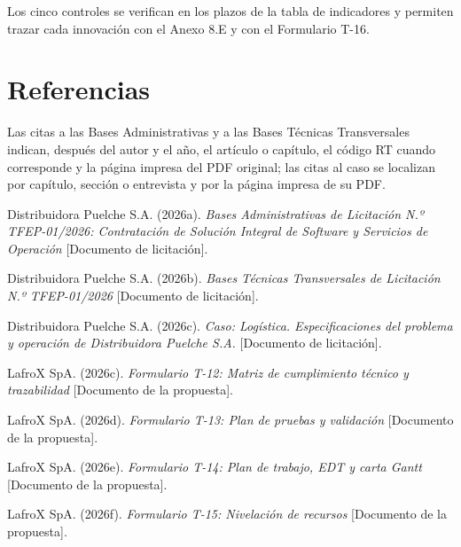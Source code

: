 Los cinco controles se verifican en los plazos de la tabla de indicadores y permiten trazar cada innovación con el Anexo 8.E y con el Formulario T-16.

\section*{Referencias}

Las citas a las Bases Administrativas y a las Bases Técnicas Transversales indican, después del autor y el año, el artículo o capítulo, el código RT cuando corresponde y la página impresa del PDF original; las citas al caso se localizan por capítulo, sección o entrevista y por la página impresa de su PDF.

\begin{list}{}{\setlength{\leftmargin}{1.27cm}\setlength{\itemindent}{-1.27cm}\setlength{\itemsep}{0.4em}\setlength{\parsep}{0pt}}
  \item Distribuidora Puelche S.A. (2026a). \emph{Bases Administrativas de Licitación N.º TFEP-01/2026: Contratación de Solución Integral de Software y Servicios de Operación} [Documento de licitación].
  \item Distribuidora Puelche S.A. (2026b). \emph{Bases Técnicas Transversales de Licitación N.º TFEP-01/2026} [Documento de licitación].
  \item Distribuidora Puelche S.A. (2026c). \emph{Caso: Logística. Especificaciones del problema y operación de Distribuidora Puelche S.A.} [Documento de licitación].
  \item \begin{samepage}LafroX SpA. (2026c). \emph{Formulario T-12: Matriz de cumplimiento técnico y trazabilidad} [Documento de la propuesta].\par\end{samepage}
  \item \begin{samepage}LafroX SpA. (2026d). \emph{Formulario T-13: Plan de pruebas y validación} [Documento de la propuesta].\par\end{samepage}
  \item \begin{samepage}LafroX SpA. (2026e). \emph{Formulario T-14: Plan de trabajo, EDT y carta Gantt} [Documento de la propuesta].\par\end{samepage}
  \item \begin{samepage}LafroX SpA. (2026f). \emph{Formulario T-15: Nivelación de recursos} [Documento de la propuesta].\par\end{samepage}

\end{list}
